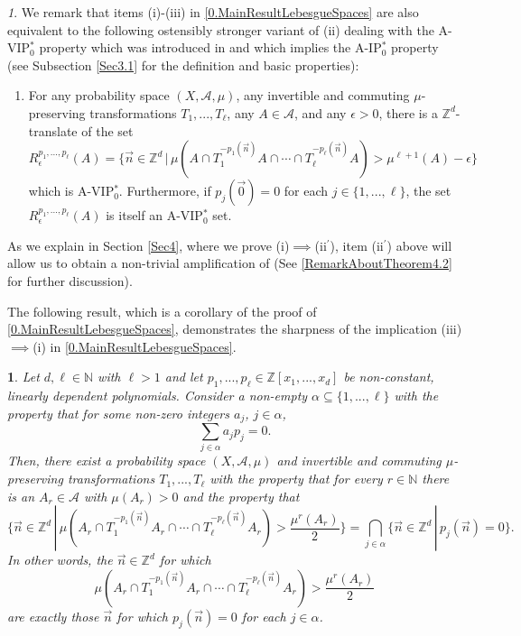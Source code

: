 \documentclass[11pt,american,preprint]{elsarticle}
\numberwithin{equation}{section}
\theoremstyle{plain}
\theoremstyle{plain*}
\theoremstyle{plain}
\theoremstyle{plain*}
\theoremstyle{plain}
\theoremstyle{plain*}
\theoremstyle{remark}
\theoremstyle{remark*}
\theoremstyle{remark}
\newtheorem{rem}[thm]{\protect\remarkname}
\theoremstyle{remark*}
\theoremstyle{remark}
\theoremstyle{remark*}
\theoremstyle{plain}
\newtheorem{cor}[thm]{\protect\corollaryname}
\providecommand{\corollaryname}{Corollary}
\theoremstyle{definition}
\theoremstyle{plain}
\theoremstyle{plain} %
\providecommand{\remarkname}{Remark}
\newcommand{\N}{\mathbb{N}}
\newcommand{\Z}{\mathbb{Z}}
\begin{document}
\begin{rem}
    We remark that items (i)-(iii) in \cref{0.MainResultLebesgueSpaces} are also equivalent to the following ostensibly  stronger variant of (ii) dealing with the A-VIP$_0^*$ property which was introduced in \cite{AlmostIPBerLeib} and which implies the A-IP$_0^*$ property (see Subsection \ref{Sec3.1} for the definition and basic properties):
       \begin{enumerate}
        \item [(ii$^{\prime}$)] For any probability space $(X,\mathcal A,\mu)$, any invertible and commuting $\mu$-preserving transformations $T_1,...,T_\ell$, any $A\in\mathcal A$, and any $\epsilon>0$, there is a $\Z^d$-translate of the set
    \begin{equation}
        R_\epsilon^{p_1,...,p_\ell}(A)=\{\vec n\in\Z^d\,|\,\mu(A\cap T_1^{-p_1(\vec n)}A\cap \cdots\cap T_\ell^{-p_\ell(\vec n)}A)>\mu^{\ell+1}(A)-\epsilon\}
    \end{equation}
    which is {\rm A-VIP$_0^*$}. Furthermore, if $p_j(\vec  0)=0$ for each $j\in\{1,...,\ell\}$, the set $R_\epsilon^{p_1,...,p_\ell}(A)$ is itself an {\rm A-VIP$_0^*$} set.
    \end{enumerate} 
As we explain in Section \ref{Sec4}, where we prove (i)$\implies$(ii$^\prime$),  item (ii$^\prime$) above will allow us to obtain   a non-trivial amplification of  \cite[Theorem 4.2]{AlmostIPBerLeib} (See \cref{RemarkAboutTheorem4.2} for further discussion). 
\end{rem}
The following result, which is a corollary of the proof of \cref{0.MainResultLebesgueSpaces}, demonstrates the sharpness of the implication  (iii)$\implies$(i) in \cref{0.MainResultLebesgueSpaces}. 
\begin{cor}\label{0.thm:Sharp(iii)->(i)}
Let $d,\ell\in\N$ with $\ell>1$ and let $p_1,...,p_\ell\in\Z[x_1,...,x_d]$ be non-constant, linearly dependent polynomials. Consider a non-empty $\alpha\subseteq \{1,...,\ell\}$ with the property that for some non-zero integers $a_j$, $j\in\alpha$,
$$\sum_{j\in\alpha}a_jp_j=0.$$ 
Then, there exist a probability space $(X,\mathcal A,\mu)$ and invertible and commuting $\mu$-preserving transformations $T_1,...,T_\ell$ with the property that for every $r\in\N$ there is an  $A_r\in\mathcal A$ with $\mu(A_r)>0$ and  the property that 
\begin{equation}\label{0.eq:EqualityWithLongerExpression}
    \{\vec n\in\Z^d\,|\,\mu(A_r\cap T_1^{-p_1(\vec n)}A_r\cap \cdots\cap T_\ell^{-p_\ell (\vec n)}A_r)>\frac{\mu^r(A_r)}{2}\}
    =\bigcap_{j\in \alpha} \{\vec n\in\Z^d\,|\,p_j(\vec n)=0\}.
\end{equation}
In other words, the $\vec n\in\Z^d$ for which 
\begin{equation}
\mu(A_r\cap T_1^{-p_1(\vec n)}A_r\cap \cdots\cap T_\ell^{-p_\ell (\vec n)}A_r)>\frac{\mu^r(A_r)}{2}
\end{equation}
are exactly those $\vec n$ for which $p_j(\vec n)=0$ for each $j\in\alpha$.
\end{cor}
\end{document}
